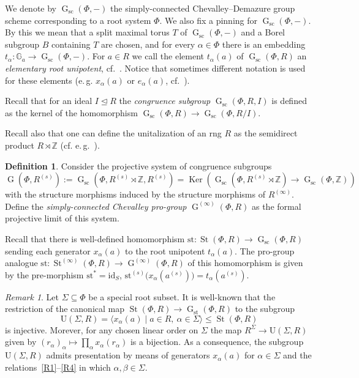 \documentclass[oneside, 11pt]{amsart}
\numberwithin{equation}{section}
\theoremstyle{definition}
\newtheorem{df}[lemma]{Definition} \Crefname{df}{Definition}{Definitions}
\theoremstyle{remark}
\newtheorem{rem}[lemma]{Remark}
\DeclareMathOperator\St{St}
\DeclareMathOperator\Ker{Ker}
\DeclareMathOperator\GG{G}
\newcommand{\ZZ}{\mathbb{Z}}
\begin{document}
We denote by $\GG_\mathrm{sc}(\Phi,-)$ the simply-connected Chevalley--Demazure group scheme corresponding to a root system $\Phi$.
We also fix a pinning for $\GG_\mathrm{sc}(\Phi,-)$. By this we mean that a split maximal torus $T$ of $\GG_\mathrm{sc}(\Phi,-)$ and a Borel subgroup $B$ containing $T$ are chosen, and for every $\alpha\in\Phi$ there is an embedding $t_\alpha\colon \mathbb{G}_a\to\GG_\mathrm{sc}(\Phi, -)$.
For $a \in R$ we call the element $t_\alpha(a)$ of $\GG_\mathrm{sc}(\Phi, R)$ an {\it elementary root unipotent}, cf.~\cite{VP}. Notice that sometimes different notation is used for these elements (e.\,g. $x_\alpha(a)$ or $e_\alpha(a)$, cf.~\cite{Ma69,St71,VP}).

Recall that for an ideal $I \trianglelefteq R$ the {\it congruence subgroup} $\GG_\mathrm{sc}(\Phi, R, I)$ is defined as 
 the kernel of the homomorphism $\GG_\mathrm{sc}(\Phi, R) \to \GG_\mathrm{sc}(\Phi, R/I)$.

Recall also that one can define the unitalization of an rng $R$ as the semidirect product $R \rtimes \ZZ$ (cf. e.\,g.~\cite[Definition~3.2]{Sin}).
 \begin{df}
Consider the projective system of congruence subgroups
 \[\GG(\Phi, R^{(s)}) := \GG_{\mathrm{sc}}(\Phi, R^{(s)} \rtimes \ZZ, R^{(s)}) = \Ker\left(\GG_{\mathrm{sc}}(\Phi, R^{(s)} \rtimes \ZZ) \to \GG_{\mathrm{sc}}(\Phi, \ZZ)\right)\] with the structure morphisms induced by the structure morphisms of \(R^{(\infty)}\). Define the {\it simply-connected Chevalley pro-group} $\GG^{(\infty)}(\Phi, R)$ as the formal projective limit of this system.
\end{df}

Recall that there is well-defined homomorphism $\mathrm{st}\colon \St(\Phi, R) \to \GG_{\mathrm{sc}}(\Phi, R)$ sending each generator $x_\alpha(a)$ to the root unipotent $t_\alpha(a)$. The pro-group analogue \(\mathrm{st} \colon \St^{(\infty)}(\Phi, R) \to \GG^{(\infty)}(\Phi, R)\) of this homomorphism is given by the pre-morphism \(\mathrm{st}^* = \mathrm{id}_S\), \(\mathrm{st}^{(s)}\bigl(x_{\alpha}(a^{(s)})\bigr) = t_\alpha(a^{(s)})\). 

\begin{rem}\label{rem:uni-rad}
Let $\Sigma \subseteq \Phi$ be a special root subset. It is well-known that the restriction of the canonical map $\St(\Phi, R)\to\GG_{\mathrm{st}}(\Phi, R)$ to the subgroup \[\mathrm{U}(\Sigma, R) = \langle x_{\alpha}(a) \mid a\in R,\ \alpha\in \Sigma \rangle \leq \St(\Phi, R)\] is injective. Morever, for any chosen linear order on \(\Sigma\) the map $R^{\Sigma} \to \mathrm{U}(\Sigma, R)$ given by $(r_\alpha)_\alpha \mapsto \prod_\alpha x_\alpha(r_\alpha)$ is a bijection. As a consequence, the subgroup $\mathrm{U}(\Sigma, R)$ admits presentation by means of generators $x_\alpha(a)$ for $\alpha \in \Sigma$ and the relations~\eqref{R1}--\eqref{R4} in which $\alpha, \beta \in \Sigma$.
\end{rem}
\end{document}
